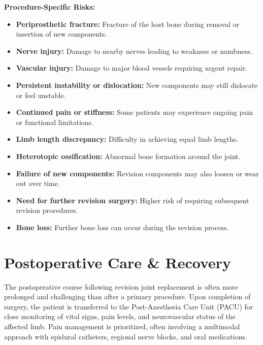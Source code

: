 \textbf{Procedure-Specific Risks:}
\begin{itemize}
  \item \textbf{Periprosthetic fracture:} Fracture of the host bone during removal or insertion of new components.
  
  \item \textbf{Nerve injury:} Damage to nearby nerves leading to weakness or numbness.
  
  \item \textbf{Vascular injury:} Damage to major blood vessels requiring urgent repair.
  
  \item \textbf{Persistent instability or dislocation:} New components may still dislocate or feel unstable.
  
  \item \textbf{Continued pain or stiffness:} Some patients may experience ongoing pain or functional limitations.
  
  \item \textbf{Limb length discrepancy:} Difficulty in achieving equal limb lengths.
  
  \item \textbf{Heterotopic ossification:} Abnormal bone formation around the joint.
  
  \item \textbf{Failure of new components:} Revision components may also loosen or wear out over time.
  
  \item \textbf{Need for further revision surgery:} Higher risk of requiring subsequent revision procedures.
  
  \item \textbf{Bone loss:} Further bone loss can occur during the revision process.
\end{itemize}

\section*{Postoperative Care \& Recovery}
The postoperative course following revision joint replacement is often more prolonged and challenging than after a primary procedure. Upon completion of surgery, the patient is transferred to the Post-Anesthesia Care Unit (PACU) for close monitoring of vital signs, pain levels, and neurovascular status of the affected limb. Pain management is prioritized, often involving a multimodal approach with epidural catheters, regional nerve blocks, and oral medications.

